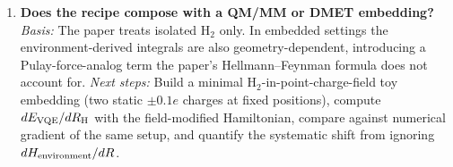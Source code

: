 \begin{enumerate}
\item \textbf{Does the recipe compose with a QM/MM or DMET embedding?}
  \emph{Basis:} The paper treats isolated H$_2$ only. In embedded settings the
  environment-derived integrals are also geometry-dependent, introducing a
  Pulay-force-analog term the paper's Hellmann--Feynman formula does not
  account for.
  \emph{Next steps:} Build a minimal H$_2$-in-point-charge-field toy embedding
  (two static $\pm 0.1e$ charges at fixed positions), compute
  $dE_{\text{VQE}}/dR_{\rm H}$ with the field-modified Hamiltonian, compare
  against numerical gradient of the same setup, and quantify the systematic
  shift from ignoring $dH_{\rm environment}/dR$.
\end{enumerate}
